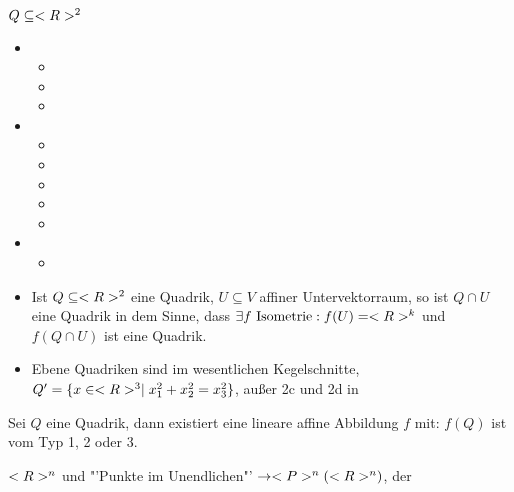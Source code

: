 \begin{example}
	$Q\subseteq<R>^2$
	\begin{itemize}
		\item \begin{itemize}
			\item {}
			\item {}
			\item {}
		\end{itemize}
		\item \begin{itemize}
			\item{}
			\item{}
			\item{}
			\item{}
			\item{}
		\end{itemize}
		\item \begin{itemize}
			\item{}
		\end{itemize}
	\end{itemize}
\end{example}

\begin{remark}
	\begin{itemize}
		\item Ist $Q\subseteq<R>^2$ eine Quadrik, $U\subseteq V$ affiner Untervektorraum, so ist $Q\cap U$ eine Quadrik in dem Sinne, dass $\exists f\text{ Isometrie}: f(U)=<R>^k$ und $f(Q\cap U)$ ist eine Quadrik.
		\item Ebene Quadriken sind im wesentlichen Kegelschnitte, $Q'=\{x\in<R>^3\mid x_1^2+x_2^2=x_3^2\}$, außer 2c und 2d in 
	\end{itemize}
\end{remark}

\begin{conclusion}
	Sei $Q$ eine Quadrik, dann existiert eine lineare affine Abbildung $f$ mit: $f(Q)$ ist vom Typ 1, 2 oder 3.
\end{conclusion}

\begin{remark}
	$<R>^n$ und "'Punkte im Unendlichen"' $\to <P>^n(<R>^n)$, der 
\end{remark}
